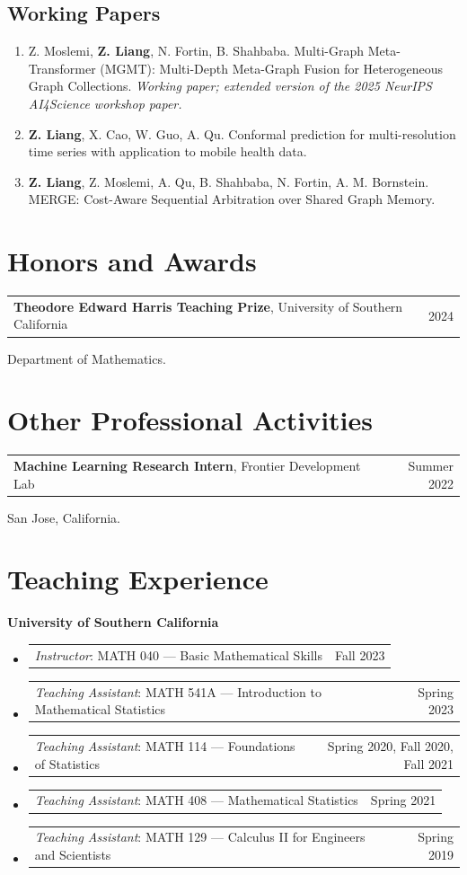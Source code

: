 \documentclass[11pt]{article}
\makeatletter
\newcommand{\cvrow}[2]{%
  \begin{tabularx}{\textwidth}{@{}Xr@{}}#1 & #2\end{tabularx}}
\makeatother
\begin{document}
\subsection*{Working Papers}

\begin{enumerate}[resume,itemsep=3pt,topsep=1pt]
  \item Z. Moslemi, \textbf{Z. Liang}, N. Fortin, B. Shahbaba. Multi-Graph Meta-Transformer (MGMT): Multi-Depth Meta-Graph Fusion for Heterogeneous Graph Collections. \textit{Working paper; extended version of the 2025 NeurIPS AI4Science workshop paper.}

  \item \textbf{Z. Liang}, X. Cao, W. Guo, A. Qu. Conformal prediction for multi-resolution time series with application to mobile health data.

  \item \textbf{Z. Liang}, Z. Moslemi, A. Qu, B. Shahbaba, N. Fortin, A. M. Bornstein. MERGE: Cost-Aware Sequential Arbitration over Shared Graph Memory.
\end{enumerate}

\section{Honors and Awards}

\cvrow{\textbf{Theodore Edward Harris Teaching Prize}, University of Southern California}{2024}
Department of Mathematics.

\section{Other Professional Activities}

\cvrow{\textbf{Machine Learning Research Intern}, Frontier Development Lab}{Summer 2022}
San Jose, California.

\section{Teaching Experience}

\textbf{University of Southern California}
\begin{itemize}
  \item \cvrow{\textit{Instructor}: MATH 040 --- Basic Mathematical Skills}{Fall 2023}
  \item \cvrow{\textit{Teaching Assistant}: MATH 541A --- Introduction to Mathematical Statistics}{Spring 2023}
  \item \cvrow{\textit{Teaching Assistant}: MATH 114 --- Foundations of Statistics}{Spring 2020, Fall 2020, Fall 2021}
  \item \cvrow{\textit{Teaching Assistant}: MATH 408 --- Mathematical Statistics}{Spring 2021}
  \item \cvrow{\textit{Teaching Assistant}: MATH 129 --- Calculus II for Engineers and Scientists}{Spring 2019}
\end{itemize}
\end{document}
